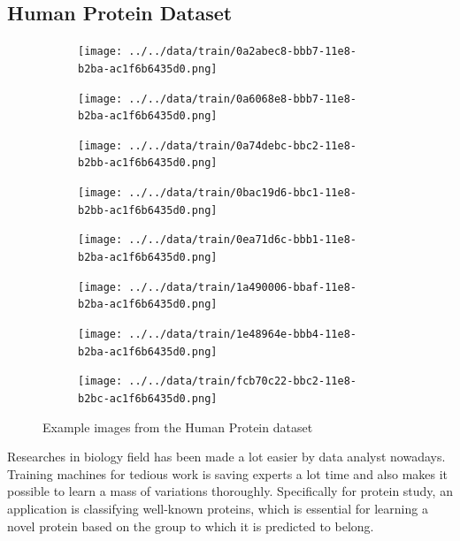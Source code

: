 \documentclass{article}
\begin{document}
\subsection{Human Protein Dataset}
\begin{figure}[h!]
    \centering
    \begin{subfigure}[b]{0.2\linewidth}
      \texttt{[image: ../../data/train/0a2abec8-bbb7-11e8-b2ba-ac1f6b6435d0.png]}
    \end{subfigure}
    \begin{subfigure}[b]{0.2\linewidth}
      \texttt{[image: ../../data/train/0a6068e8-bbb7-11e8-b2ba-ac1f6b6435d0.png]}
    \end{subfigure}
    \begin{subfigure}[b]{0.2\linewidth}
        \texttt{[image: ../../data/train/0a74debc-bbc2-11e8-b2bb-ac1f6b6435d0.png]}
    \end{subfigure}
    \begin{subfigure}[b]{0.2\linewidth}
        \texttt{[image: ../../data/train/0bac19d6-bbc1-11e8-b2bb-ac1f6b6435d0.png]}
    \end{subfigure}

    \begin{subfigure}[b]{0.2\linewidth}
        \texttt{[image: ../../data/train/0ea71d6c-bbb1-11e8-b2ba-ac1f6b6435d0.png]}
      \end{subfigure}
      \begin{subfigure}[b]{0.2\linewidth}
        \texttt{[image: ../../data/train/1a490006-bbaf-11e8-b2ba-ac1f6b6435d0.png]}
      \end{subfigure}
      \begin{subfigure}[b]{0.2\linewidth}
          \texttt{[image: ../../data/train/1e48964e-bbb4-11e8-b2ba-ac1f6b6435d0.png]}
      \end{subfigure}
      \begin{subfigure}[b]{0.2\linewidth}
          \texttt{[image: ../../data/train/fcb70c22-bbc2-11e8-b2bc-ac1f6b6435d0.png]}
      \end{subfigure}
    \caption{Example images from the Human Protein dataset}
  \end{figure}
  
  Researches in biology field has been made a lot easier by data analyst nowadays. Training machines for tedious work is saving experts a lot time and also makes it possible to learn a mass of variations thoroughly. Specifically for protein study, an application is classifying well-known proteins, which is essential for learning a novel protein based on the group to which it is predicted to belong. 
\end{document}

